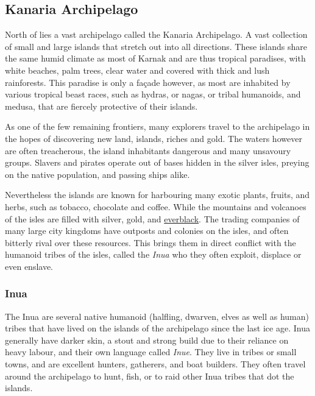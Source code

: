 \subsection{Kanaria Archipelago}
\label{sec:Kanaria Archipelago}

North of  lies a vast archipelago called the Kanaria
Archipelago. A vast collection of small and large islands that stretch out
into all directions. These islands share the same humid climate as most of
Karnak and are thus tropical paradises, with white beaches, palm trees, clear
water and covered with thick and lush rainforests. This paradise is only a
façade however, as most are inhabited by various tropical beast races, such as
hydras, or nagas, or tribal humanoids, and medusa, that are fiercely
protective of their islands.

As one of the few remaining frontiers, many explorers travel to the archipelago
in the hopes of discovering new land, islands, riches and gold. The waters
however are often treacherous, the island inhabitants dangerous and many
unsavoury groups. Slavers and pirates operate out of bases hidden in the
silver isles, preying on the native population, and passing ships alike.

Nevertheless the islands are known for harbouring many exotic plants, fruits,
and herbs, such as tobacco, chocolate and coffee. While the mountains and
volcanoes of the isles are filled with silver, gold, and
\hyperref[sec:Everblack]{everblack}. The trading companies of many large city
kingdoms have outposts and colonies on the isles, and often bitterly rival
over these resources. This brings them in direct conflict with the humanoid
tribes of the isles, called the \emph{Inua} who they often exploit, displace
or even enslave.

\subsubsection{Inua}
\label{sec:Inua}

The Inua are several native humanoid (halfling, dwarven, elves as well as
human) tribes that have lived on the islands of the archipelago since the last
ice age. Inua generally have darker skin, a stout and strong build due to their
reliance on heavy labour, and their own language called \emph{Inue}. They live
in tribes or small towns, and are excellent hunters, gatherers, and boat
builders. They often travel around the archipelago to hunt, fish, or to raid
other Inua tribes that dot the islands.

